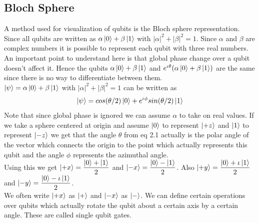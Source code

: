\documentclass{report}
\begin{document}
\subsection{Bloch Sphere}
A method used for visualization of qubits is the Bloch sphere representation. Since all qubits are written as $\alpha\ket{0} + \beta\ket{1}$ with $|\alpha|^2 + |\beta|^2 = 1$. 
Since $\alpha$ and $\beta$ are complex numbers it is possible to represent each qubit with three real numbers. An important point to understand here is that global phase change over a qubit doesn't affect it. 
Hence the qubits $\alpha\ket{0} + \beta\ket{1}$ and $e^{\iota\theta}(\alpha\ket{0} + \beta\ket{1})$ are the same since there is no way to differentiate between them.\\
$\ket{\psi} = \alpha\ket{0} + \beta\ket{1}$ with $|\alpha|^2 + |\beta|^2 = 1$ can be written as\\
\begin{equation}\ket{\psi} = cos(\theta/2)\ket{0} + e^{\iota\phi}sin(\theta/2)\ket{1}\end{equation}
Note that since global phase is ignored we can assume $\alpha$ to take on real values.
If we take a sphere centered at origin and assume $\ket{0}$ to represent $\ket{+z}$ and $\ket{1}$ to represent $\ket{-z}$ we get that the angle $\theta$ from eq 2.1 actually is the polar angle of the vector which connects the origin to the point which actually represents this qubit and the angle $\phi$ represents the azimuthal angle.\\
Using this we get $\ket{+x} = \dfrac{\ket{0} + \ket{1}}{2}$ and $\ket{-x} = \dfrac{\ket{0} - \ket{1}}{2}$.
Also $\ket{+y} = \dfrac{\ket{0} + \iota\ket{1}}{2}$ and $\ket{-y} = \dfrac{\ket{0} - \iota\ket{1}}{2}$.\\
We often write $\ket{+x}$ as $\ket{+}$ and $\ket{-x}$ as $\ket{-}$.
We can define certain operations over qubits which actually rotate the qubit about a certain axis by a certain angle. These are called single qubit gates.\\
\end{document}
